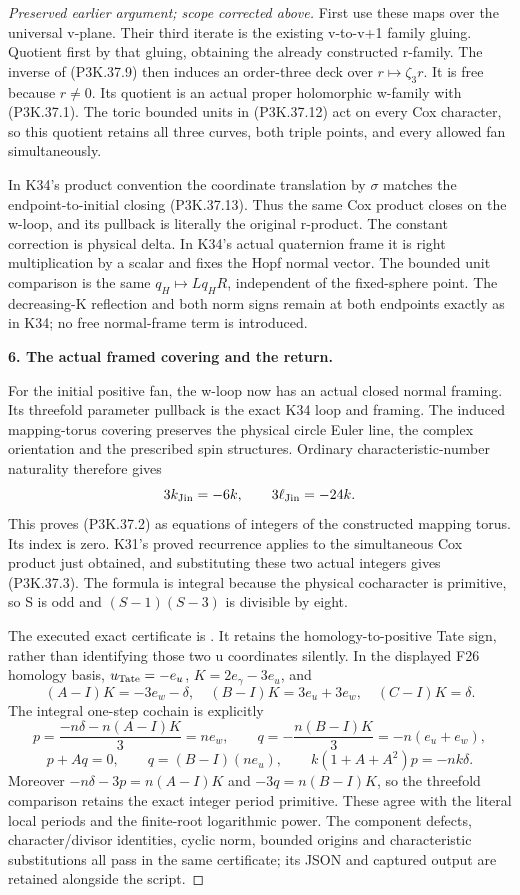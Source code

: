 \begin{proof}[Preserved earlier argument; scope corrected above]
First use these maps over the universal v-plane. Their third iterate is
the existing v-to-v+1 family gluing. Quotient first by that gluing, obtaining
the already constructed r-family. The inverse of (P3K.37.9) then induces an
order-three deck over \(r\mapsto\zeta_3r\). It is free because
\(r\ne0\). Its quotient is an actual proper holomorphic w-family with
(P3K.37.1). The toric bounded units in (P3K.37.12) act on every Cox character,
so this quotient retains all three curves, both triple points, and every
allowed fan simultaneously.

In K34's product convention the coordinate translation by \(\sigma\)
matches the endpoint-to-initial closing (P3K.37.13). Thus the same Cox product
closes on the w-loop, and its pullback is literally the original r-product.
The constant correction is physical delta. In K34's actual quaternion frame
it is right multiplication by a scalar and fixes the Hopf normal vector.
The bounded unit comparison is the same \(q_H\mapsto Lq_HR\),
independent of the fixed-sphere point. The decreasing-K reflection and both
norm signs remain at both endpoints exactly as in K34; no free normal-frame
term is introduced.

\par\medskip\noindent\textbf{6. The actual framed covering and the return.}\enspace

For the initial positive fan, the w-loop now has an actual closed normal
framing. Its threefold parameter pullback is the exact K34 loop and framing.
The induced mapping-torus covering preserves the physical circle Euler line,
the complex orientation and the prescribed spin structures. Ordinary
characteristic-number naturality therefore gives
\[
 3k_{\rm Jin}=-6k,\qquad 3\ell_{\rm Jin}=-24k.
\]
This proves (P3K.37.2) as equations of integers of the constructed mapping torus.
Its index is zero. K31's proved recurrence applies to the simultaneous Cox
product just obtained, and substituting these two actual integers gives
(P3K.37.3). The formula is integral because the physical cocharacter is primitive,
so S is odd and \((S-1)(S-3)\) is divisible by eight.

The executed exact certificate is
. It retains the homology-to-positive
Tate sign, rather than identifying those two u coordinates silently. In the
displayed F26 homology basis,
\(u_{\rm Tate}=-e_u\), \(K=2e_\gamma-3e_u\), and
\[
 (A-I)K=-3e_w-\delta,\quad
 (B-I)K=3e_u+3e_w,\quad (C-I)K=\delta.
\]
The integral one-step cochain is explicitly
\[
 p=\frac{-n\delta-n(A-I)K}{3}=ne_w,\qquad
 q=-\frac{n(B-I)K}{3}=-n(e_u+e_w),
\]
\[
 p+Aq=0,\qquad q=(B-I)(ne_u),\qquad
 k(1+A+A^2)p=-nk\delta.
\]
Moreover \(-n\delta-3p=n(A-I)K\) and \(-3q=n(B-I)K\),
so the threefold comparison retains the exact integer period primitive.
These agree with the literal local periods and the finite-root logarithmic
power. The component defects, character/divisor identities, cyclic norm,
bounded origins and characteristic substitutions all pass in the same
certificate; its JSON and captured output are retained alongside the script.


\end{proof}

